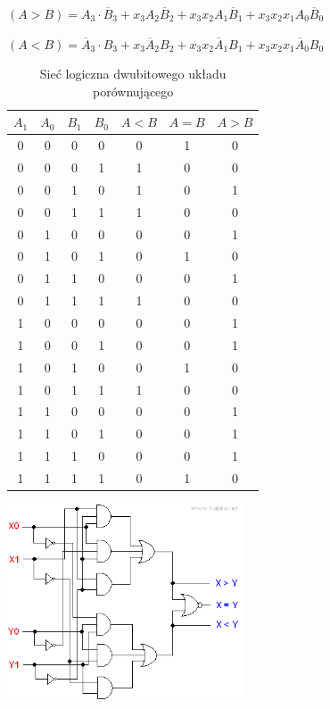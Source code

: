 \documentclass[a4paper,12pt]{article}
\begin{document}
$(A>B)=A_3 \cdot \overline{B}_3+x_3 A_2 \overline{B}_2+x_3 x_2 A_1 \overline{B}_1+x_3x_2x_1 A_0 \overline{B}_0$

$(A<B)=\overline{A}_3 \cdot B_3+x_3 \overline{A}_2 B_2+x_3 x_2 \overline{A}_1 B_1+x_3x_2x_1 \overline{A}_0 B_0$


\begin{table}[h!]
\centering

\begin{minipage}{9cm}
\centering

\begin{tabular}{ | c | c | c | c || c | c | c | }
  \hline
  $A_1$ & $A_0$ & $B_1$ & $B_0$ & $A<B$ & $A=B$ & $A>B$ \\ \hline
  0 & 0 & 0 & 0 & 0 & 1 & 0 \\
  0 & 0 & 0 & 1 & 1 & 0 & 0 \\
  0 & 0 & 1 & 0 & 1 & 0 & 1 \\
  0 & 0 & 1 & 1 & 1 & 0 & 0 \\ \hline
  0 & 1 & 0 & 0 & 0 & 0 & 1 \\
  0 & 1 & 0 & 1 & 0 & 1 & 0 \\
  0 & 1 & 1 & 0 & 0 & 0 & 1 \\
  0 & 1 & 1 & 1 & 1 & 0 & 0 \\ \hline
  1 & 0 & 0 & 0 & 0 & 0 & 1 \\
  1 & 0 & 0 & 1 & 0 & 0 & 1 \\
  1 & 0 & 1 & 0 & 0 & 1 & 0 \\
  1 & 0 & 1 & 1 & 1 & 0 & 0 \\ \hline
  1 & 1 & 0 & 0 & 0 & 0 & 1 \\
  1 & 1 & 0 & 1 & 0 & 0 & 1 \\
  1 & 1 & 1 & 0 & 0 & 0 & 1 \\
  1 & 1 & 1 & 1 & 0 & 1 & 0 \\
  \hline
\end{tabular}
\end{minipage}
\begin{minipage}{7.5cm}
   \includegraphics[width=7cm]{grafika/obwody/circuit_diagram_2_bit_magnitude_comparator.png}
   \caption*{Sieć logiczna dwubitowego układu porównującego}
\end{minipage}
\end{table}
\end{document}
